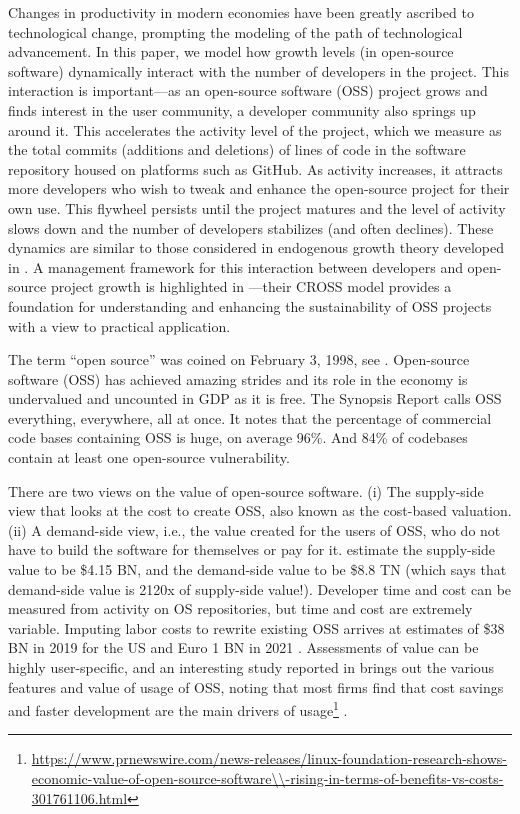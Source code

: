 \documentclass[conference]{IEEEtran}
\begin{document}
Changes in productivity in modern economies have been greatly ascribed to technological change, prompting the modeling of the path of technological advancement. In this paper, we model how growth levels (in open-source software) dynamically interact with the number of developers in the project. This interaction is important---as an open-source software (OSS) project grows and finds interest in the user community, a developer community also springs up around it. This accelerates the activity level of the project, which we measure as the total commits (additions and deletions) of lines of code in the software repository housed on platforms such as GitHub. As activity increases, it attracts more developers who wish to tweak and enhance the open-source project for their own use. This flywheel persists until the project matures and the level of activity slows down and the number of developers stabilizes (and often declines). These dynamics are similar to those considered in endogenous growth theory developed in \cite{romer_endogenous_1990}. A management framework for this interaction between developers and open-source project growth is highlighted in \cite{dey_cross_2024}---their CROSS model provides a foundation for understanding and enhancing the sustainability of OSS projects with a view to  practical application.

The term ``open source'' was coined on February 3, 1998, see  \cite{peterson_how_2018}. Open-source software (OSS) has achieved amazing strides and its role in the economy is undervalued and uncounted in GDP as it is free. The Synopsis Report \citep{bals_2024_2024} calls OSS everything, everywhere, all at once. It notes that the percentage of commercial code bases containing OSS is huge, on average 96\%. And 84\% of codebases contain at least one open-source vulnerability. 

There are two views on the value of open-source software. (i) The supply-side view that looks at the cost to create OSS, also known as the cost-based valuation. (ii) A demand-side view, i.e., the value created for the users of OSS, who do not have to build the software for themselves or pay for it. \cite{hoffmann_value_2024} estimate the supply-side value to be \$4.15 BN, and the demand-side value to be \$8.8 TN (which says that demand-side value is 2120x of supply-side value!). Developer time and cost can be measured from activity on OS repositories, but time and cost are extremely variable. Imputing labor costs to rewrite existing OSS arrives at estimates of \$38 BN in 2019 for the US \citep{robbins_first_2021} and Euro 1 BN in 2021 \citep{blind_impact_2021, blind_estimating_2024}. Assessments of value can be highly user-specific, and an interesting study reported in \cite{chesbrough_measuring_2023} brings out the various features and value of usage of OSS, noting that most firms find that cost savings and faster development are the main drivers of usage\footnote{\url{https://www.prnewswire.com/news-releases/linux-foundation-research-shows-economic-value-of-open-source-software\\-rising-in-terms-of-benefits-vs-costs-301761106.html}} \citep{wladawsky-berger_impact_2022, wladawsky-berger_whats_2024}.
\end{document}
